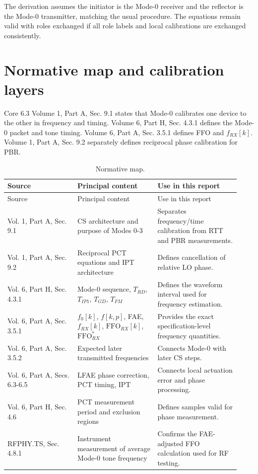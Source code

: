 \documentclass[10pt,a4paper]{article}
\newcommand{\FFO}{\mathrm{FFO}}
\begin{document}
The derivation assumes the initiator is the Mode-0 receiver and the reflector is the Mode-0 transmitter, matching the usual procedure. The equations remain valid with roles exchanged if all role labels and local calibrations are exchanged consistently.

\section{Normative map and calibration layers}
Core 6.3 Volume 1, Part A, Sec. 9.1 states that Mode-0 calibrates one device to the other in frequency and timing. Volume 6, Part H, Sec. 4.3.1 defines the Mode-0 packet and tone timing. Volume 6, Part A, Sec. 3.5.1 defines FFO and $f_{RX}[k]$. Volume 1, Part A, Sec. 9.2 separately defines reciprocal phase calibration for PBR.

\begin{longtable}{@{}p{0.28\linewidth}p{0.32\linewidth}p{0.33\linewidth}@{}}
\caption{Normative map.}\\
\toprule Source & Principal content & Use in this report \\
\midrule\endfirsthead
\toprule Source & Principal content & Use in this report \\
\midrule\endhead
Vol. 1, Part A, Sec. 9.1 & CS architecture and purpose of Modes 0-3 & Separates frequency/time calibration from RTT and PBR measurements.\\
Vol. 1, Part A, Sec. 9.2 & Reciprocal PCT equations and IPT architecture & Defines cancellation of relative LO phase.\\
Vol. 6, Part H, Sec. 4.3.1 & Mode-0 sequence, $T_{RD}$, $T_{IP1}$, $T_{GD}$, $T_{FM}$ & Defines the waveform interval used for frequency estimation.\\
Vol. 6, Part A, Sec. 3.5.1 & $f_0[k]$, $f[k,p]$, FAE, $f_{RX}[k]$, $\FFO_{RX}[k]$, $\FFO_{RX}^{*}$ & Provides the exact specification-level frequency quantities.\\
Vol. 6, Part A, Sec. 3.5.2 & Expected later transmitted frequencies & Connects Mode-0 with later CS steps.\\
Vol. 6, Part A, Secs. 6.3-6.5 & LFAE phase correction, PCT timing, IPT & Connects local actuation error and phase processing.\\
Vol. 6, Part H, Sec. 4.6 & PCT measurement period and exclusion regions & Defines samples valid for phase measurement.\\
RFPHY.TS, Sec. 4.8.1 & Instrument measurement of average Mode-0 tone frequency & Confirms the FAE-adjusted FFO calculation used for RF testing.\\
\bottomrule
\end{longtable}
\end{document}
